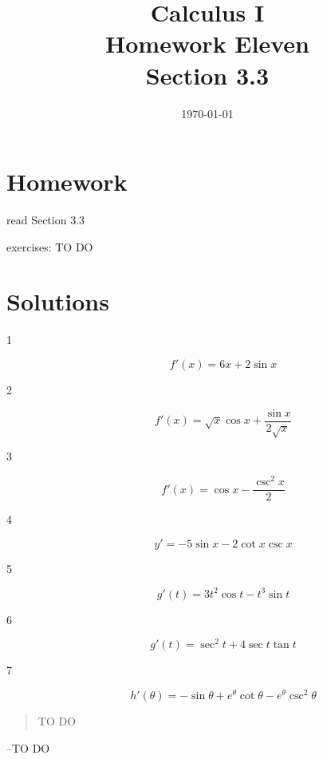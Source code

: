 \documentclass[letterpaper, landscape]{exam}
\title{Calculus I \\ Homework Eleven \\ Section 3.3}
\author{}
\date{\today}
\begin{document}
  \maketitle

  \section{Homework}
    \begin{itemize*}
      \item read Section 3.3
      \item exercises: TO DO
    \end{itemize*}

  \ifprintanswers

  \section{Solutions}

  \begin{description}

    \item[1] 
      \[
        f'(x) = 6x + 2 \sin x
      \]

    \item[2] 
      \[
        f'(x) = \sqrt{x} \cos{x} + \frac{\sin{x}}{2 \sqrt{x}}
      \]

    \item[3] 
      \[
        f'(x) = \cos x - \frac{\csc^2 x}{2}
      \]

    \item[4] 
      \[
        y' = - 5 \sin x - 2 \cot x \csc x
      \]

    \item[5] 
      \[
        g'(t) = 3t^2 \cos t - t^3 \sin t
      \]

    \item[6] 
      \[
        g'(t) = \sec^2 t + 4 \sec t \tan t
      \]

    \item[7] 
      \[
        h'(\theta) = - \sin \theta + e^{\theta} \cot \theta - e^{\theta} \csc^2 \theta
      \]

   \end{description}
 
  \else
    \vspace{10 cm}
    \begin{quote}
      \begin{em}
        TO DO
      \end{em}
    \end{quote}
    \hspace{2 cm} --TO DO
  \fi
\end{document}

